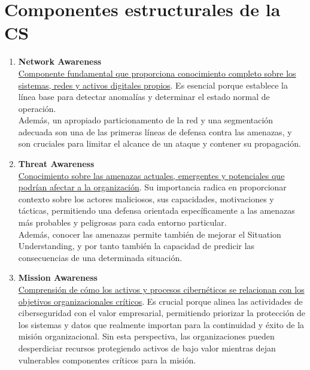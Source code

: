 \section{Componentes estructurales de la CS}
\begin{enumerate}[resume]
\item \textbf{Network Awareness} \\
\ul{Componente fundamental que proporciona conocimiento completo sobre los sistemas, redes y activos digitales propios}. Es esencial porque establece la línea base para detectar anomalías y determinar el estado normal de operación.\\
Además, un apropiado particionamento de la red y una segmentación adecuada son una de las primeras líneas de defensa contra las amenazas, y son cruciales para limitar el alcance de un ataque y contener su propagación.


\item \textbf{Threat Awareness} \\
\ul{Conocimiento sobre las amenazas actuales, emergentes y potenciales que podrían afectar a la organización}. Su importancia radica en proporcionar contexto sobre los actores maliciosos, sus capacidades, motivaciones y tácticas, permitiendo una defensa orientada específicamente a las amenazas más probables y peligrosas para cada entorno particular.\\
Además, conocer las amenazas permite también de mejorar el Situation Understanding, y por tanto también la capacidad de predicir las consecuencias de una determinada situación. 



\item \textbf{Mission Awareness} \\
\ul{Comprensión de cómo los activos y procesos cibernéticos se relacionan con los objetivos organizacionales críticos}. Es crucial porque alinea las actividades de ciberseguridad con el valor empresarial, permitiendo priorizar la protección de los sistemas y datos que realmente importan para la continuidad y éxito de la misión organizacional. Sin esta perspectiva, las organizaciones pueden desperdiciar recursos protegiendo activos de bajo valor mientras dejan vulnerables componentes críticos para la misión.


\end{enumerate}
